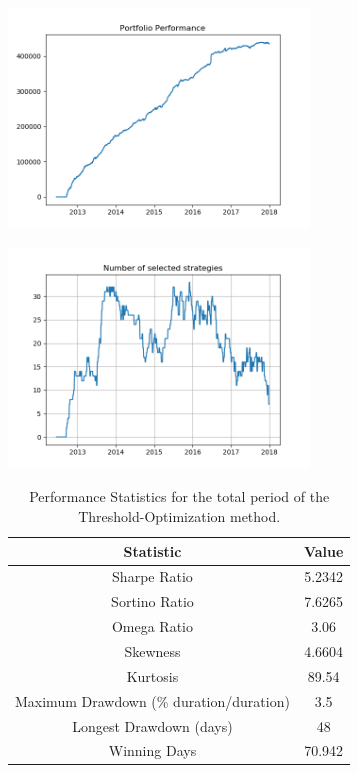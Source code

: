 \begin{center}
	\centering
	\includegraphics[width=0.6\textwidth]{GridSearches/Threshold_Backtest/PnL_Out_of_Sample.png}
	
\end{center}

\begin{center}
	\centering
	\includegraphics[width=0.6\textwidth]{GridSearches/Threshold_Backtest/num_strats_Out_of_Sample.png}
	\label{Threshold_Backtest_OOS_n_strats}
\end{center}

\begin{table}
	\centering
	\begin{tabular}{c|c}
		\textbf{Statistic} & \textbf{Value} \\\hline
		Sharpe Ratio & 5.2342 \\ 
		Sortino Ratio & 7.6265 \\ 
		Omega Ratio & 3.06 \\ 
		Skewness & 4.6604 \\ 
		Kurtosis & 89.54 \\ 
		Maximum Drawdown (\% duration/duration) & 3.5 \\ 
		Longest Drawdown (days) & 48 \\ 
		Winning Days & 70.942 \\ 
	\end{tabular}
	\label{table:tot_perf_threshold_backtest}
	\caption{\label{table:tot_perf_threshold_backtest} Performance Statistics for the total period of the Threshold-Optimization method.}
\end{table}

